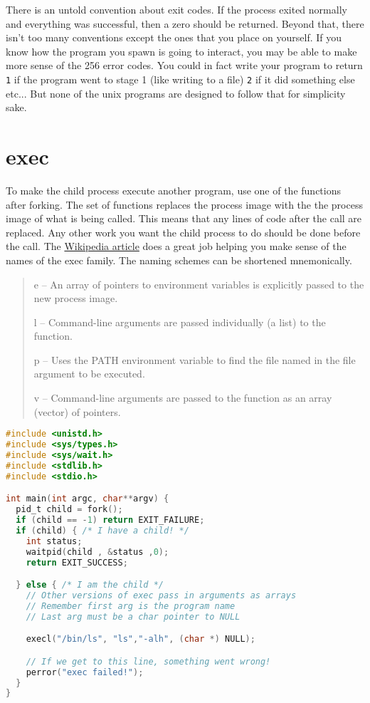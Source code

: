 There is an untold convention about exit codes. If the process exited normally and everything was successful, then a zero should be returned. Beyond that, there isn't too many conventions except the ones that you place on yourself. If you know how the program you spawn is going to interact, you may be able to make more sense of the 256 error codes. You could in fact write your program to return \texttt{1} if the program went to stage 1 (like writing to a file) \texttt{2} if it did something else etc... But none of the unix programs are designed to follow that for simplicity sake.

\section{exec}

To make the child process execute another program, use one of the \href{http://man7.org/linux/man-pages/man3/exec.3.html}{} functions after forking. The  set of functions replaces the process image with the the process image of what is being called. This means that any lines of code after the  call are replaced. Any other work you want the child process to do should be done before the  call. The \href{https://en.wikipedia.org/wiki/Exec_(system_call)\#C_language_prototypes}{Wikipedia article} does a great job helping you make sense of the names of the exec family. The naming schemes can be shortened mnemonically.

\begin{quote}
e -- An array of pointers to environment variables is explicitly passed to the new process image.

l -- Command-line arguments are passed individually (a list) to the function.

p -- Uses the PATH environment variable to find the file named in the file argument to be executed.

v -- Command-line arguments are passed to the function as an array (vector) of pointers.
\end{quote}

\begin{lstlisting}[language=C]
#include <unistd.h>
#include <sys/types.h> 
#include <sys/wait.h>
#include <stdlib.h>
#include <stdio.h>

int main(int argc, char**argv) {
  pid_t child = fork();
  if (child == -1) return EXIT_FAILURE;
  if (child) { /* I have a child! */
    int status;
    waitpid(child , &status ,0);
    return EXIT_SUCCESS;

  } else { /* I am the child */
    // Other versions of exec pass in arguments as arrays
    // Remember first arg is the program name
    // Last arg must be a char pointer to NULL

    execl("/bin/ls", "ls","-alh", (char *) NULL);

    // If we get to this line, something went wrong!
    perror("exec failed!");
  }
}
\end{lstlisting}

